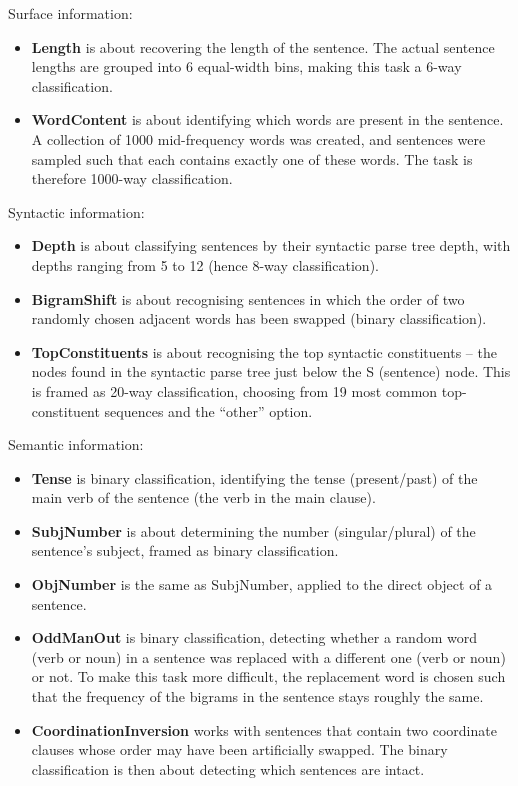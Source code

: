 \documentclass[bsc,frontabs,twoside,singlespacing,parskip,deptreport]{infthesis}
\begin{document}
{{    Surface information:
    \begin{itemize}
      \item \textbf{Length} is about recovering the length of the sentence. The actual sentence lengths are grouped into 6 equal-width bins, making this task a 6-way classification.
      \item \textbf{WordContent} is about identifying which words are present in the sentence. A collection of 1000 mid-frequency words was created, and sentences were sampled such that each contains exactly one of these words. The task is therefore 1000-way classification.
    \end{itemize}
    Syntactic information:
    \begin{itemize}
      \item \textbf{Depth} is about classifying sentences by their syntactic parse tree depth, with depths ranging from 5 to 12 (hence 8-way classification).
      \item \textbf{BigramShift} is about recognising sentences in which the order of two randomly chosen adjacent words has been swapped (binary classification).
      \item \textbf{TopConstituents} is about recognising the top syntactic constituents -- the nodes found in the syntactic parse tree just below the S (sentence) node. This is framed as 20-way classification, choosing from 19 most common top-constituent sequences and the ``other'' option.
    \end{itemize}
    Semantic information:
    \begin{itemize}
      \item \textbf{Tense} is binary classification, identifying the tense (present/past) of the main verb of the sentence (the verb in the main clause).
      \item \textbf{SubjNumber} is about determining the number (singular/plural) of the sentence's subject, framed as binary classification.
      \item \textbf{ObjNumber} is the same as SubjNumber, applied to the direct object of a sentence.
      \item \textbf{OddManOut} is binary classification, detecting whether a random word (verb or noun) in a sentence was replaced with a different one (verb or noun) or not. To make this task more difficult, the replacement word is chosen such that the frequency of the bigrams in the sentence stays roughly the same.
      \item \textbf{CoordinationInversion} works with sentences that contain two coordinate clauses whose order may have been artificially swapped. The binary classification is then about detecting which sentences are intact.
    \end{itemize}

}}
\end{document}
